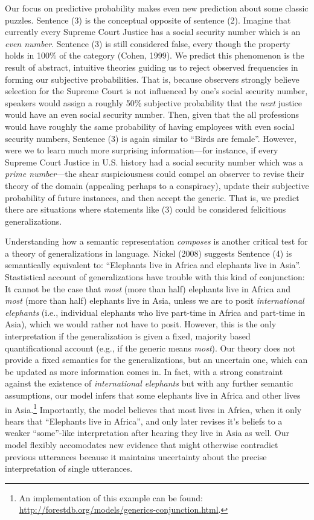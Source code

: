 \documentclass[english,floatsintext,man]{apa6}
\theoremstyle{definition}
\theoremstyle{definition}
\theoremstyle{definition}
\theoremstyle{remark}
\begin{document}
Our focus on predictive probability makes even new prediction about some
classic puzzles. Sentence (3) is the conceptual opposite of sentence
(2). Imagine that currently every Supreme Court Justice has a social
security number which is an \emph{even number}. Sentence (3) is still
considered false, every though the property holds in 100\% of the
category (Cohen, 1999). We predict this phenomenon is the result of
abstract, intuitive theories guiding us to reject observed frequencies
in forming our subjective probabilities. That is, because observers
strongly believe selection for the Supreme Court is not influenced by
one's social security number, speakers would assign a roughly 50\%
subjective probability that the \emph{next} justice would have an even
social security number. Then, given that the all professions would have
roughly the same probability of having employees with even social
security numbers, Sentence (3) is again similar to \enquote{Birds are
female}. However, were we to learn much more surprising
information---for instance, if every Supreme Court Justice in U.S.
history had a social security number which was a \emph{prime
number}---the shear suspiciousness could compel an observer to revise
their theory of the domain (appealing perhaps to a conspiracy), update
their subjective probability of future instances, and then accept the
generic. That is, we predict there are situations where statements like
(3) could be considered felicitious generalizations.

Understanding how a semantic representation \emph{composes} is another
critical test for a theory of generalizations in language. Nickel (2008)
suggests Sentence (4) is semantically equivalent to: \enquote{Elephants
live in Africa and elephants live in Asia}. Stastistical account of
generalizations have trouble with this kind of conjunction: It cannot be
the case that \emph{most} (more than half) elephants live in Africa and
\emph{most} (more than half) elephants live in Asia, unless we are to
posit \emph{international elephants} (i.e., individual elephants who
live part-time in Africa and part-time in Asia), which we would rather
not have to posit. However, this is the only interpretation if the
generalization is given a fixed, majority based quantificational account
(e.g., if the generic means \emph{most}). Our theory does not provide a
fixed semantics for the generalizations, but an uncertain one, which can
be updated as more information comes in. In fact, with a strong
constraint against the existence of \emph{international elephants} but
with any further semantic assumptions, our model infers that some
elephants live in Africa and other lives in Asia.\footnote{An
  implementation of this example can be found:
  \url{http://forestdb.org/models/generics-conjunction.html}.}
Importantly, the model believes that most lives in Africa, when it only
hears that \enquote{Elephants live in Africa}, and only later revises
it's beliefs to a weaker \enquote{some}-like interpretation after
hearing they live in Asia as well. Our model flexibly accomodates new
evidence that might otherwise contradict previous utterances because it
maintains uncertainty about the precise interpretation of single
utterances.
\end{document}

